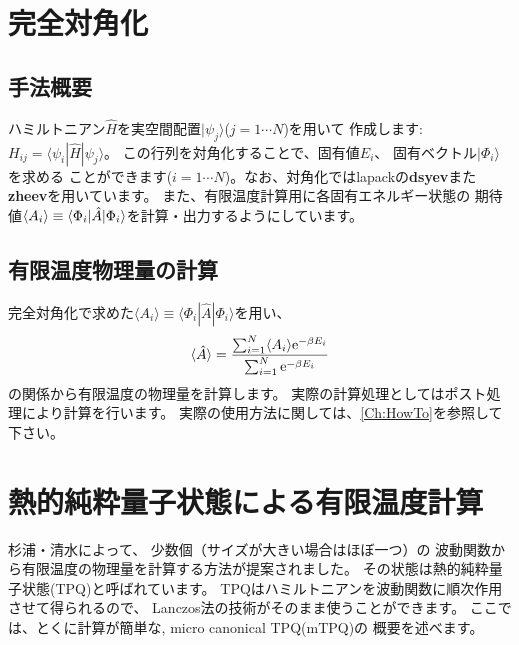 \section{完全対角化}
\label{Ch:AllDiagonalization}
\subsection{手法概要}
ハミルトニアン${\hat{H}}$を実空間配置$| \psi_j \rangle$($j=1\cdots N$)を用いて
作成します: $H_{ij}= \langle \psi_i | {\hat H} | \psi_j \rangle$。
この行列を対角化することで、固有値$E_i$、 固有ベクトル$|\Phi_i\rangle$を求める
ことができます($i=1 \cdots N$)。なお、対角化ではlapackの{\bf dsyev}また
{\bf zheev}を用いています。
また、有限温度計算用に各固有エネルギー状態の
期待値$\langle A_i\rangle \equiv \langle \Phi_i | {\hat A} | \Phi_i\rangle$を計算・出力するようにしています。
\subsection{有限温度物理量の計算}
完全対角化で求めた$\langle A_i\rangle \equiv \langle \Phi_i | {\hat A} | \Phi_i\rangle$を用い、
\begin{equation}
\langle {\hat A}\rangle=\frac{\sum_{i=1}^N \langle A_i\rangle {\rm  e}^{-\beta E_i}}{\sum_{i=1}^N{\rm  e}^{-\beta E_i}}
\end{equation}
の関係から有限温度の物理量を計算します。
実際の計算処理としてはポスト処理により計算を行います。
実際の使用方法に関しては、\ref{Ch:HowTo}を参照して下さい。

\section{熱的純粋量子状態による有限温度計算}
\label{Ch:TPQ}
杉浦・清水によって、
少数個（サイズが大きい場合はほぼ一つ）の
波動関数から有限温度の物理量を計算する方法が提案されました\cite{Sugiura2012}。
その状態は熱的純粋量子状態(TPQ)と呼ばれています。
TPQはハミルトニアンを波動関数に順次作用させて得られるので、
Lanczos法の技術がそのまま使うことができます。
ここでは、とくに計算が簡単な, micro canonical TPQ(mTPQ)の
概要を述べます。

